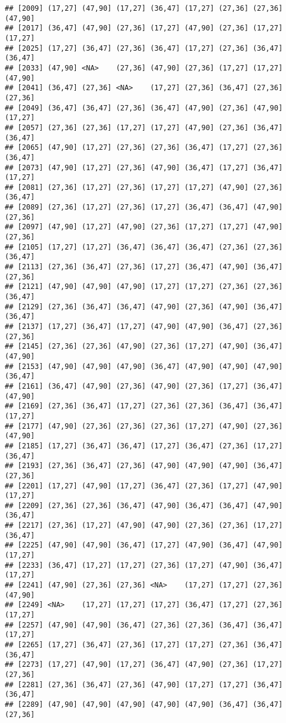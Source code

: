 \documentclass[12pt,]{article}
\begin{document}
\begin{verbatim}
## [2009] (17,27] (47,90] (17,27] (36,47] (17,27] (27,36] (27,36] (47,90]
## [2017] (36,47] (47,90] (27,36] (17,27] (47,90] (27,36] (17,27] (17,27]
## [2025] (17,27] (36,47] (27,36] (36,47] (17,27] (27,36] (36,47] (36,47]
## [2033] (47,90] <NA>    (27,36] (47,90] (27,36] (17,27] (17,27] (47,90]
## [2041] (36,47] (27,36] <NA>    (17,27] (27,36] (36,47] (27,36] (27,36]
## [2049] (36,47] (36,47] (27,36] (36,47] (47,90] (27,36] (47,90] (17,27]
## [2057] (27,36] (27,36] (17,27] (17,27] (47,90] (27,36] (36,47] (36,47]
## [2065] (47,90] (17,27] (27,36] (27,36] (36,47] (17,27] (27,36] (36,47]
## [2073] (47,90] (17,27] (27,36] (47,90] (36,47] (17,27] (36,47] (17,27]
## [2081] (27,36] (17,27] (27,36] (17,27] (17,27] (47,90] (27,36] (36,47]
## [2089] (27,36] (17,27] (27,36] (17,27] (36,47] (36,47] (47,90] (27,36]
## [2097] (47,90] (17,27] (47,90] (27,36] (17,27] (17,27] (47,90] (27,36]
## [2105] (17,27] (17,27] (36,47] (36,47] (36,47] (27,36] (27,36] (36,47]
## [2113] (27,36] (36,47] (27,36] (17,27] (36,47] (47,90] (36,47] (27,36]
## [2121] (47,90] (47,90] (47,90] (17,27] (17,27] (27,36] (27,36] (36,47]
## [2129] (27,36] (36,47] (36,47] (47,90] (27,36] (47,90] (36,47] (36,47]
## [2137] (17,27] (36,47] (17,27] (47,90] (47,90] (36,47] (27,36] (27,36]
## [2145] (27,36] (27,36] (47,90] (27,36] (17,27] (47,90] (36,47] (47,90]
## [2153] (47,90] (47,90] (47,90] (36,47] (47,90] (47,90] (47,90] (36,47]
## [2161] (36,47] (47,90] (27,36] (47,90] (27,36] (17,27] (36,47] (47,90]
## [2169] (27,36] (36,47] (17,27] (27,36] (27,36] (36,47] (36,47] (17,27]
## [2177] (47,90] (27,36] (27,36] (27,36] (17,27] (47,90] (27,36] (47,90]
## [2185] (17,27] (36,47] (36,47] (17,27] (36,47] (27,36] (17,27] (36,47]
## [2193] (27,36] (36,47] (27,36] (47,90] (47,90] (47,90] (36,47] (27,36]
## [2201] (17,27] (47,90] (17,27] (36,47] (27,36] (17,27] (47,90] (17,27]
## [2209] (27,36] (27,36] (36,47] (47,90] (36,47] (36,47] (47,90] (36,47]
## [2217] (27,36] (17,27] (47,90] (47,90] (27,36] (27,36] (17,27] (36,47]
## [2225] (47,90] (47,90] (36,47] (17,27] (47,90] (36,47] (47,90] (17,27]
## [2233] (36,47] (17,27] (17,27] (27,36] (17,27] (47,90] (36,47] (17,27]
## [2241] (47,90] (27,36] (27,36] <NA>    (17,27] (17,27] (27,36] (47,90]
## [2249] <NA>    (17,27] (17,27] (17,27] (36,47] (17,27] (27,36] (17,27]
## [2257] (47,90] (47,90] (36,47] (27,36] (27,36] (36,47] (36,47] (17,27]
## [2265] (17,27] (36,47] (27,36] (17,27] (17,27] (27,36] (36,47] (36,47]
## [2273] (17,27] (47,90] (17,27] (36,47] (47,90] (27,36] (17,27] (27,36]
## [2281] (27,36] (36,47] (27,36] (47,90] (17,27] (17,27] (36,47] (36,47]
## [2289] (47,90] (47,90] (47,90] (47,90] (47,90] (36,47] (36,47] (27,36]

\end{verbatim}
\end{document}
